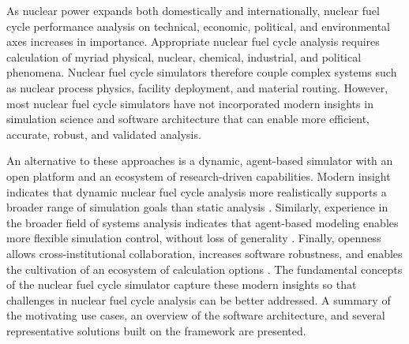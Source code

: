 
As nuclear power expands both domestically and internationally, nuclear fuel cycle
performance analysis on technical, economic, political, and environmental axes increases
in importance. Appropriate nuclear fuel cycle analysis requires calculation of myriad physical, nuclear,
chemical, industrial, and political phenomena. Nuclear fuel cycle simulators
therefore couple complex systems such as nuclear process physics,
facility deployment, and material routing. However, most nuclear fuel cycle
simulators have not incorporated modern insights in simulation science and
software architecture that can enable more efficient, accurate, robust, and
validated analysis.

An alternative to these approaches is a dynamic, agent-based simulator with an
open platform and an ecosystem of research-driven capabilities.  Modern
insight indicates that dynamic nuclear fuel cycle analysis more realistically
supports a broader range of simulation goals than static analysis
\cite{piet_dynamic_2011}. Similarly, experience in the broader field of systems
analysis indicates that agent-based modeling enables more flexible simulation
control, without loss of generality \cite{macal_agent-based_2010}. Finally, openness
allows cross-institutional collaboration, increases software robustness, and
enables the cultivation of an ecosystem of calculation options
\cite{softwarecarpentryresource}.  The fundamental concepts of the \Cyclus
nuclear fuel cycle simulator capture these modern insights so that challenges
in nuclear fuel cycle analysis can be better addressed. A summary of the
motivating use cases, an overview of the software architecture, and several
representative solutions built on the framework are presented.


